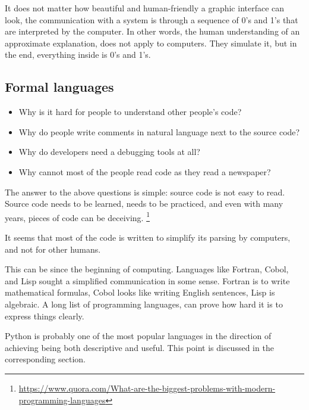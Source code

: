 It does not matter how beautiful and human-friendly a graphic interface can look,
the communication with a system is through a sequence of 0's and 1's that are interpreted by the computer.
In other words, the human understanding of an approximate explanation, does not apply to computers.
They simulate it, but in the end, everything inside is 0's and 1's.


\subsection{Formal languages}

\begin{itemize}
    \item Why is it hard for people to understand other people's code?
    \item Why do people write comments in natural language next to the source code?
    \item Why do developers need a debugging tools at all?
    \item Why cannot most of the people read code as they read a newspaper?
\end{itemize}
The answer to the above questions is simple: source code is not easy to read.
Source code needs to be learned, needs to be practiced, and even with many years, pieces of code can be deceiving.
\footnote{\url{https://www.quora.com/What-are-the-biggest-problems-with-modern-programming-languages}}

It seems that most of the code is written to simplify its parsing by computers, and not for other humans.

This can be since the beginning of computing.
Languages like Fortran, Cobol, and Lisp sought a simplified communication in some sense.
Fortran is to write mathematical formulas, Cobol looks like writing English sentences, Lisp is algebraic.
A long list of programming languages, can prove how hard it is to express things clearly.

Python is probably one of the most popular languages in the direction of achieving being both descriptive and useful.
This point is discussed in the corresponding section.


